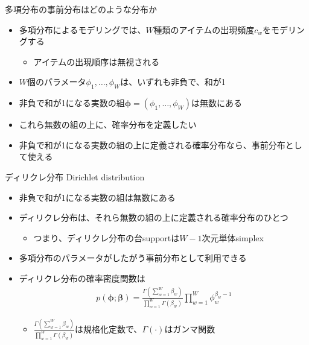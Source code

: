 \documentclass[aspectratio=169,unicode,dvipdfmx,14pt]{beamer}
\begin{document}
\begin{frame}{多項分布の事前分布はどのような分布か}
\begin{itemize}
\item 多項分布によるモデリングでは、$W$種類のアイテムの出現頻度$c_w$をモデリングする
\begin{itemize}
\item アイテムの出現順序は無視される
\end{itemize}
\item $W$個のパラメータ$\phi_1,\ldots,\phi_W$は、いずれも非負で、和が1
\item 非負で和が1になる実数の組$\bm{\phi}=(\phi_1,\ldots,\phi_W)$は無数にある
\item これら無数の組の上に、確率分布を定義したい
\item 非負で和が1になる実数の組の上に定義される確率分布なら、事前分布として使える
\end{itemize}
\end{frame}

\begin{frame}{ディリクレ分布 Dirichlet distribution}
\begin{itemize}
\item 非負で和が1になる実数の組は無数にある
\item ディリクレ分布は、それら無数の組の上に定義される確率分布のひとつ
\begin{itemize}
\item つまり、ディリクレ分布の台supportは$W-1$次元単体simplex
\end{itemize}
\item 多項分布のパラメータがしたがう事前分布として利用できる
\item ディリクレ分布の確率密度関数は
\begin{align}
p(\bm{\phi};\bm{\beta})=\frac{\Gamma(\sum_{w=1}^W \beta_w)}{\prod_{w=1}^W\Gamma(\beta_w)}
\prod_{w=1}^W \phi_w^{\beta_w - 1}
\end{align}
\begin{itemize}
\item $\frac{\Gamma(\sum_{w=1}^W \beta_w)}{\prod_{w=1}^W\Gamma(\beta_w)}$は規格化定数で、$\Gamma(\cdot)$はガンマ関数
\end{itemize}
\end{itemize}
\end{frame}
\end{document}
